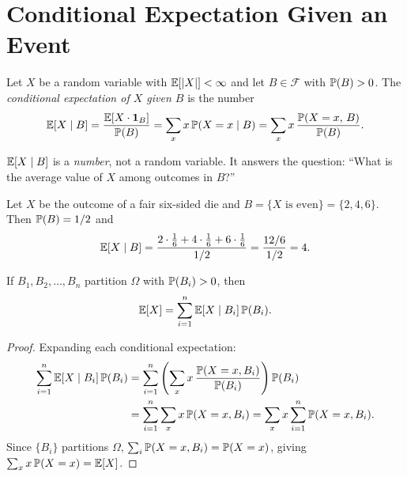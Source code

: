 \documentclass[11pt,a4paper]{article}
\begin{document}

\section{Conditional Expectation Given an Event}
\label{sec:cond_event}

\begin{definition}
\label{def:cond_exp_event}
Let $X$ be a random variable with $\mathbb{E}[|X|] < \infty$ and let
$B \in \mathcal{F}$ with $\mathbb{P}(B) > 0$.  The
\emph{conditional expectation of $X$ given $B$} is the number
\begin{equation}
  \mathbb{E}[X \mid B]
  = \frac{\mathbb{E}[X \cdot \mathbf{1}_B]}{\mathbb{P}(B)}
  = \sum_x x\, \mathbb{P}(X = x \mid B)
  = \sum_x x\, \frac{\mathbb{P}(X = x,\, B)}{\mathbb{P}(B)}.
  \label{eq:cond_exp_event}
\end{equation}
\end{definition}

\begin{remark}
$\mathbb{E}[X \mid B]$ is a \emph{number}, not a random variable.
It answers the question: ``What is the average value of $X$
among outcomes in $B$?''
\end{remark}

\begin{example}
\label{ex:die_event}
Let $X$ be the outcome of a fair six-sided die and
$B = \{X \text{ is even}\} = \{2, 4, 6\}$.  Then $\mathbb{P}(B) = 1/2$
and
\[
  \mathbb{E}[X \mid B]
  = \frac{2 \cdot \tfrac{1}{6} + 4 \cdot \tfrac{1}{6}
          + 6 \cdot \tfrac{1}{6}}{1/2}
  = \frac{12/6}{1/2} = 4.
\]
\end{example}

\begin{proposition}
\label{prop:total_exp_events}
If $B_1, B_2, \ldots, B_n$ partition $\Omega$ with
$\mathbb{P}(B_i) > 0$, then
\begin{equation}
  \mathbb{E}[X] = \sum_{i=1}^n \mathbb{E}[X \mid B_i]\, \mathbb{P}(B_i).
  \label{eq:total_exp_events}
\end{equation}
\end{proposition}

\begin{proof}
Expanding each conditional expectation:
\begin{align}
  \sum_{i=1}^n \mathbb{E}[X \mid B_i]\, \mathbb{P}(B_i)
  &= \sum_{i=1}^n \left(\sum_x x\,
    \frac{\mathbb{P}(X = x, B_i)}{\mathbb{P}(B_i)}\right) \mathbb{P}(B_i)
  \nonumber\\
  &= \sum_{i=1}^n \sum_x x\, \mathbb{P}(X = x, B_i)
  = \sum_x x \sum_{i=1}^n \mathbb{P}(X = x, B_i).
  \label{eq:total_exp_step}
\end{align}
Since $\{B_i\}$ partitions $\Omega$,
$\sum_i \mathbb{P}(X = x, B_i) = \mathbb{P}(X = x)$, giving
$\sum_x x\, \mathbb{P}(X = x) = \mathbb{E}[X]$.
\end{proof}
\end{document}
